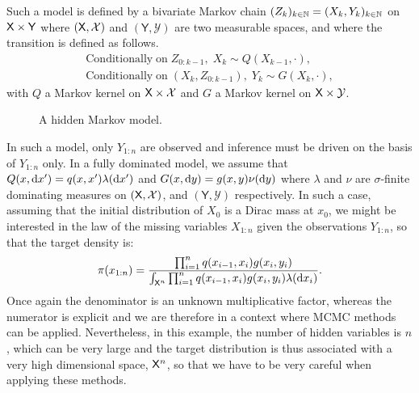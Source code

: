 \documentclass[english,graybox,envcountchap,envcountsame,sectrefs,shortlabels]{svmono}
\theoremstyle{style}
\newcommand{\Yset}{\mathsf{Y}}
\newcommand{\Ysigma}{\mathcal{Y}}
\begin{document}
 
\begin{example}
Such a model is defined by a bivariate Markov chain $(Z_k)_{k\in\mathbb{N}}=(X_k,Y_k)_{k\in\mathbb{N}}$ on $\Xset\times\Yset$ where $(\mathsf{X},\mathcal{X})$ and $(\Yset,\Ysigma)$ are two measurable spaces, and where the transition is defined as follows.
\begin{align*}
\mathrm{Conditionally \; on \;} Z_{0:k-1}, \; X_k \sim Q(X_{k-1},\cdot),\\
\mathrm{Conditionally \; on \; } (X_k,Z_{0:k-1}), \;  Y_k \sim G(X_k,\cdot),
\end{align*}
with $Q$  a Markov kernel on $\mathsf{X} \times \mathcal{X}$ and $G$  a Markov kernel on $\Xset \times \Ysigma$.


\begin{figure}[!h]
\begin{center}
\end{center}
\caption{A hidden Markov model.}
\label{hmm}
\end{figure}
In such a model, only $Y_{1:n}$ are observed and inference must be driven on the basis of $Y_{1:n}$ only. 
In a fully dominated model, we assume that $Q(x,\mathrm{d} x')=q(x,x') \lambda(\mathrm{d} x')$ and $G(x,\mathrm{d} y)=g(x,y) \nu(\mathrm{d} y)$ where $\lambda$ and $\nu$ are $\sigma$-finite dominating measures on $(\mathsf{X},\mathcal{X})$, and $(\Yset, \Ysigma)$ respectively. In such a case, assuming that the initial distribution of $X_0$ is a Dirac mass at $x_0$, we might be interested in the law of the missing variables $X_{1:n}$ given the observations $Y_{1:n}$, so that the target density is:
$$
\pi(x_{1:n})=\frac{\prod_{i=1}^{n} q(x_{i-1},x_i)g(x_i,y_i)}{\int_{\mathsf{X}^n} \prod_{i=1}^{n} q(x_{i-1},x_i)g(x_i,y_i) \lambda(\mathrm{d} x_i)}.
$$
Once again the denominator is an unknown multiplicative factor, whereas the numerator is explicit and we are therefore in a context where MCMC methods can be applied. Nevertheless, in this example, the number of hidden variables is $n$, which can be very large and the target distribution is thus associated with a very high dimensional space, $\mathsf{X}^n$, so that we have to be very careful when applying these methods.
\end{example}
\end{document}
